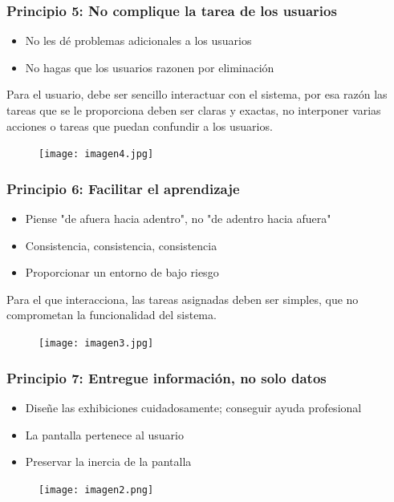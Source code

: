 \documentclass[11pt]{beamer}
\begin{document}
\begin{frame}
\frametitle{Principio 5: No complique la tarea de los usuarios}
    \par
    \justify
    \color{black}
    \begin{itemize}
    \item No les dé problemas adicionales a los usuarios
    \item No hagas que los usuarios razonen por eliminación
    \end{itemize}
    \par
    \vspace{2mm}
    Para el usuario, debe ser sencillo interactuar con el sistema, por esa razón las tareas que se le proporciona deben ser claras y exactas, no interponer varias acciones o tareas que puedan confundir a los usuarios.
    \begin{figure}
    \centering
     \texttt{[image: imagen4.jpg]} 
    \end{figure}
\end{frame}

\begin{frame}
\frametitle{Principio 6: Facilitar el aprendizaje}
    \par
    \justify
    \color{black}
    \begin{itemize}
    \item Piense "de afuera hacia adentro", no "de adentro hacia afuera"
    \item Consistencia, consistencia, consistencia 
    \item Proporcionar un entorno de bajo riesgo
    \end{itemize}
    \par
    \vspace{2mm}
    Para el que interacciona, las tareas asignadas deben ser simples, que no comprometan la funcionalidad del sistema.
    \begin{figure}
    \centering
     \texttt{[image: imagen3.jpg]} 
    \end{figure}
\end{frame}

\begin{frame}
\frametitle{Principio 7: Entregue información, no solo datos}
    \par
    \justify
    \color{black}
    \begin{itemize}
    \item Diseñe las exhibiciones cuidadosamente; conseguir ayuda profesional
    \item La pantalla pertenece al usuario 
    \item Preservar la inercia de la pantalla 
    \end{itemize}
    \begin{figure}
    \centering
     \texttt{[image: imagen2.png]} 
    \end{figure}
\end{frame}
\end{document}
